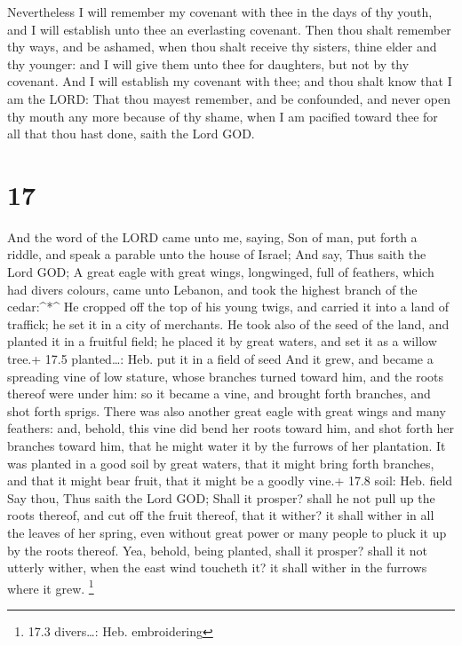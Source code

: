  Nevertheless I will remember my covenant with thee in the
days of thy youth, and I will establish unto thee an everlasting
covenant.  Then thou shalt remember thy ways, and be
ashamed, when thou shalt receive thy sisters, thine elder and thy
younger: and I will give them unto thee for daughters, but not by thy
covenant.  And I will establish my covenant with thee; and
thou shalt know that I am the LORD:  That thou mayest
remember, and be confounded, and never open thy mouth any more because
of thy shame, when I am pacified toward thee for all that thou hast
done, saith the Lord GOD.

\hypertarget{section-16}{%
\section{17}\label{section-16}}

 And the word of the LORD came unto me, saying, 
Son of man, put forth a riddle, and speak a parable unto the house of
Israel;  And say, Thus saith the Lord GOD; A great eagle
with great wings, longwinged, full of feathers, which had divers
colours, came unto Lebanon, and took the highest branch of the
cedar:\^{}*\^{}  He cropped off the top of his young twigs,
and carried it into a land of traffick; he set it in a city of
merchants.  He took also of the seed of the land, and
planted it in a fruitful field; he placed it by great waters, and set it
as a willow tree.+ 17.5 planted\ldots: Heb. put it in a field of seed
 And it grew, and became a spreading vine of low stature,
whose branches turned toward him, and the roots thereof were under him:
so it became a vine, and brought forth branches, and shot forth sprigs.
 There was also another great eagle with great wings and
many feathers: and, behold, this vine did bend her roots toward him, and
shot forth her branches toward him, that he might water it by the
furrows of her plantation.  It was planted in a good soil by
great waters, that it might bring forth branches, and that it might bear
fruit, that it might be a goodly vine.+ 17.8 soil: Heb. field
 Say thou, Thus saith the Lord GOD; Shall it prosper? shall
he not pull up the roots thereof, and cut off the fruit thereof, that it
wither? it shall wither in all the leaves of her spring, even without
great power or many people to pluck it up by the roots thereof.
 Yea, behold, being planted, shall it prosper? shall it not
utterly wither, when the east wind toucheth it? it shall wither in the
furrows where it grew. \footnote{17.3 divers\ldots: Heb. embroidering}

